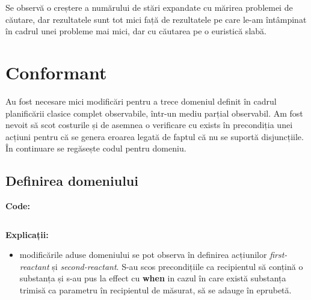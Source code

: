 Se observă o creștere a numărului de stări expandate cu mărirea problemei de căutare, dar rezultatele sunt tot mici față de rezultatele pe care le-am întâmpinat în cadrul unei probleme mai mici, dar cu căutarea pe o euristică slabă.


\vspace{0.75cm}
\section{Conformant}
Au fost necesare mici modificări pentru a trece domeniul definit în cadrul planificării clasice complet observabile, într-un mediu parțial observabil. Am fost nevoit să scot costurile și de asemnea o verificare cu exists în precondiția unei acțiuni pentru că se genera eroarea legată de faptul că nu se suportă disjuncțiile. În continuare se regăsește codul pentru domeniu.

\subsection{Definirea domeniului}
\textbf{Code:}
\inputminted[linenos]{python}{code/Conformant/robchemy.pddl}
\textbf{Explicații:}
\begin{itemize}
    \setlength\itemsep{0em}
    \item modificările aduse domeniului se pot observa în definirea acțiunilor \textit{first-reactant} și \textit{second-reactant}. S-au scos precondițiile ca recipientul să conțină o substanța și s-au pus la effect cu \textbf{when} in cazul în care există substanța trimisă ca parametru în recipientul de măsurat, să se adauge în eprubetă.

\end{itemize}

